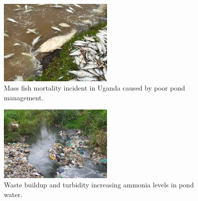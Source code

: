 \documentclass[12pt,a4paper]{article}
\begin{document}
\begin{figure}[H]
    \centering
    \includegraphics[width=0.5\textwidth]{img/dead fish.jpg}
    \caption{Mass fish mortality incident in Uganda caused by poor pond management.}
    \label{fig:deadfish}
\end{figure}

\begin{figure}[H]
    \centering
    \includegraphics[width=0.5\textwidth]{img/waste.jpg}
    \caption{Waste buildup and turbidity increasing ammonia levels in pond water.}
    \label{fig:waste}
\end{figure}
\end{document}
